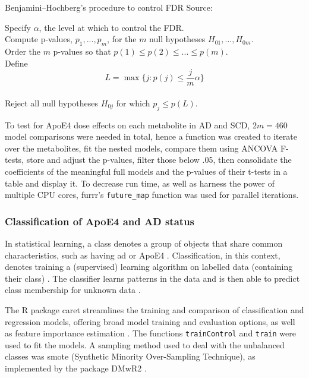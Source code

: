\documentclass{amsart}
\begin{document}
\begin{algorithm}
\caption{Benjamini–Hochberg's procedure to control FDR Source: \cite{James2023AnEdition}}\label{alg:fdr}
Specify $\alpha$, the level at which to control the FDR.\\
Compute p-values, $p_1, ... , p_m$, for the $m$ null hypotheses $H_{01},...,H_{0m}$. \\
Order the $m$ p-values so that $p(1) \leq p(2) \leq ... \leq p(m)$.\\
Define
\[L = \max\{j : p(j) \leq \frac{j}{m}\alpha\}\] \\
Reject all null hypotheses $H_{0j}$ for which $p_j \leq p(L)$.
\end{algorithm}

To test for ApoE4 dose effects on each metabolite in AD and SCD, $2m=460$ model comparisons were needed in total, hence a function was created to iterate over the metabolites, fit the nested models, compare them using ANCOVA F-tests, store and adjust the p-values, filter those below .05, then consolidate the coefficients of the meaningful full models and the p-values of their t-tests in a table and display it. To decrease run time, as well as harness the power of multiple CPU cores, \textsf{furrr}'s \texttt{future\_map} function was used for parallel iterations.

\subsubsection{Classification of ApoE4 and AD status}\label{rq2}
In statistical learning, a class denotes a group of objects that share common characteristics, such as having \acrshort{ad} or ApoE4 \cite*{Drummond2010}. Classification, in this context, denotes training a (supervised) learning algorithm on labelled data (containing their class) \cite*{Drummond2010}. The classifier learns patterns in the data and is then able to predict class membership for unknown data \cite*{Drummond2010}.

The R package \textsf{caret} streamlines the training and comparison of classification and regression models, offering broad model training and evaluation options, as well as feature importance estimation \cite{Kuhn2008BuildingPackage}. The functions \texttt{trainControl} and \texttt{train} were used to fit the models. A sampling method used to deal with the unbalanced classes was \acrshort{smote} (Synthetic Minority Over-Sampling Technique), as implemented by the package \textsf{DMwR2} \cite{DMwR2}.
\end{document}
